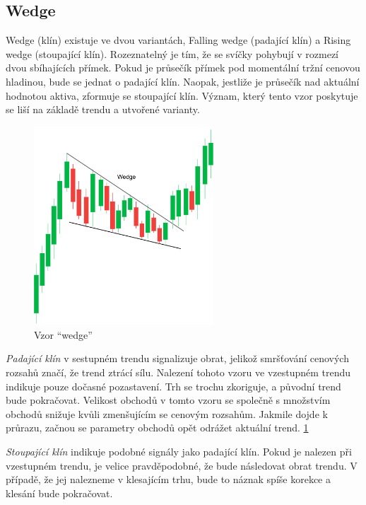 \subsection{Wedge}
Wedge (klín) existuje ve dvou variantách, Falling wedge (padající klín) a Rising wedge (stoupající klín). Rozeznatelný je tím, že se svíčky pohybují v rozmezí dvou sbíhajících přímek.
Pokud je průsečík přímek pod momentální tržní cenovou hladinou, bude se jednat o padající klín. Naopak, jestliže je průsečík nad aktuální hodnotou aktiva, zformuje se stoupající klín.
Význam, který tento vzor poskytuje se liší na základě trendu a utvořené varianty.
\begin{figure}[ht]
    \centering
    \includegraphics[width=0.6\textwidth]{Figures/wedge.pdf}
    \caption{Vzor \enquote{wedge}}
    \label{fig:wedge}
\end{figure}

\emph{Padající klín} v sestupném trendu signalizuje obrat, jelikož smršťování cenových rozsahů značí, že trend ztrácí sílu. Nalezení tohoto vzoru ve vzestupném trendu indikuje pouze
dočasné pozastavení. Trh se trochu zkoriguje, a původní trend bude pokračovat. Velikost obchodů v tomto vzoru se společně s množstvím obchodů snižuje kvůli zmenšujícím se cenovým
rozsahům. Jakmile dojde k průrazu, začnou se parametry obchodů opět odrážet aktuální trend. \ref{fig:wedge}

\emph{Stoupající klín} indikuje podobné signály jako padající klín. Pokud je nalezen při vzestupném trendu, je velice pravděpodobné, že bude následovat obrat trendu. V případě, že jej
nalezneme v klesajícím trhu, bude to náznak spíše korekce a klesání bude pokračovat.

